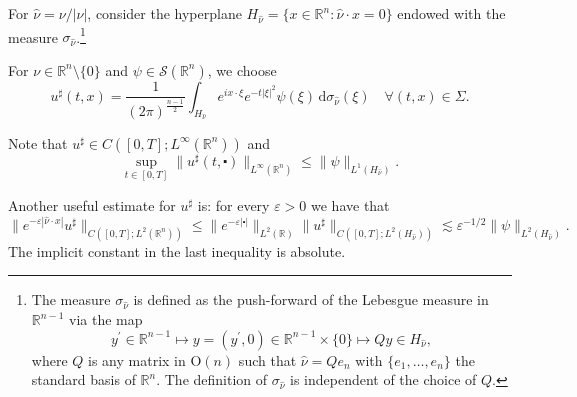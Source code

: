 \documentclass[10pt,a4paper]{amsart}
\theoremstyle{remark}
\theoremstyle{definition}
\newcommand{\R}{\mathbb{R}}
\newcommand{\dd}{\mathrm{d}}
\newcommand{\Orth}{\mathrm{O}}
\begin{document}
For $\hat{\nu} = \nu / |\nu|$, consider the hyperplane
$ H_{\hat{\nu}} = \{ x \in \R^n : \hat{\nu} \cdot x = 0 \} $
endowed with the measure $\sigma_{\hat{\nu}}$.\footnote{The measure $\sigma_{\hat{\nu}}$ is
defined as the push-forward of the 
Lebesgue measure in $\R^{n-1}$ via the map
\[ y^\prime \in \R^{n-1} \longmapsto y=(y^\prime, 0) \in \R^{n-1} \times \{ 0 \} \longmapsto Q y \in H_{\hat{\nu}}, \]
where $Q$ is any matrix in $\Orth(n)$ such that $\hat{\nu} = Q e_n$
with $\{ e_1, \dots , e_n \}$ the standard basis of $\R^n$. The definition of 
$\sigma_{\hat{\nu}}$ is independent of the choice of $Q$.}

For $\nu \in \R^n \setminus \{0\}$ and $\psi \in \mathcal{S} (\R^n)$, we choose
\begin{equation}
\label{id:ushrap}
u^\sharp (t, x) = \frac{1}{(2\pi)^\frac{n-1}{2}} \int_{H_{\hat{\nu}}} e^{ix \cdot \xi} e^{- t |\xi|^2} {\psi}(\xi) \, \dd \sigma_{\hat{\nu}} (\xi) \quad \forall (t, x) \in \Sigma.
\end{equation}

Note that $u^\sharp \in C([0,T]; L^\infty(\R^n))$ and
\[\sup_{t \in [0, T]} \| u^\sharp (t, \centerdot) \|_{L^\infty(\R^n)} \leq \| \psi \|_{L^1(H_{\hat \nu})}.\]

Another useful estimate for $u^\sharp$ is: for every 
$\varepsilon > 0$ we have that
\begin{equation}\label{in:usharp_full-space}
\| e^{-\varepsilon |\hat \nu \cdot x|} u^\sharp \|_{C([0, T]; L^2(\R^n))} \leq \| e^{-\varepsilon |\centerdot|} \|_{L^2(\R)} \| u^\sharp \|_{C([0, T]; L^2(H_{\hat \nu}))} \lesssim \varepsilon^{-1/2} \| \psi \|_{L^2(H_{\hat \nu})}.
\end{equation}
The implicit constant in the last inequality is absolute.
\end{document}
